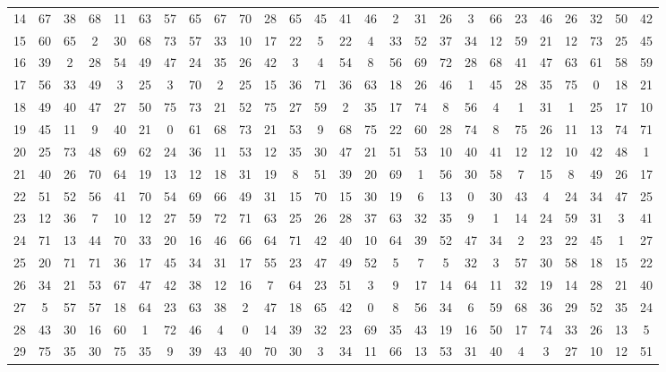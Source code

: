 \begin{table}
\begin{tabular}{c c c c c c c c c c c c c c c c c c c c c c c c c c }
14 & 67 & 38 & 68 & 11 & 63 & 57 & 65 & 67 & 70 & 28 & 65 & 45 & 41 & 46 & 2 & 31 & 26 & 3 & 66 & 23 & 46 & 26 & 32 & 50 & 42 \\
15 & 60 & 65 & 2 & 30 & 68 & 73 & 57 & 33 & 10 & 17 & 22 & 5 & 22 & 4 & 33 & 52 & 37 & 34 & 12 & 59 & 21 & 12 & 73 & 25 & 45 \\
16 & 39 & 2 & 28 & 54 & 49 & 47 & 24 & 35 & 26 & 42 & 3 & 4 & 54 & 8 & 56 & 69 & 72 & 28 & 68 & 41 & 47 & 63 & 61 & 58 & 59 \\
17 & 56 & 33 & 49 & 3 & 25 & 3 & 70 & 2 & 25 & 15 & 36 & 71 & 36 & 63 & 18 & 26 & 46 & 1 & 45 & 28 & 35 & 75 & 0 & 18 & 21 \\
18 & 49 & 40 & 47 & 27 & 50 & 75 & 73 & 21 & 52 & 75 & 27 & 59 & 2 & 35 & 17 & 74 & 8 & 56 & 4 & 1 & 31 & 1 & 25 & 17 & 10 \\
19 & 45 & 11 & 9 & 40 & 21 & 0 & 61 & 68 & 73 & 21 & 53 & 9 & 68 & 75 & 22 & 60 & 28 & 74 & 8 & 75 & 26 & 11 & 13 & 74 & 71 \\
20 & 25 & 73 & 48 & 69 & 62 & 24 & 36 & 11 & 53 & 12 & 35 & 30 & 47 & 21 & 51 & 53 & 10 & 40 & 41 & 12 & 12 & 10 & 42 & 48 & 1 \\
21 & 40 & 26 & 70 & 64 & 19 & 13 & 12 & 18 & 31 & 19 & 8 & 51 & 39 & 20 & 69 & 1 & 56 & 30 & 58 & 7 & 15 & 8 & 49 & 26 & 17 \\
22 & 51 & 52 & 56 & 41 & 70 & 54 & 69 & 66 & 49 & 31 & 15 & 70 & 15 & 30 & 19 & 6 & 13 & 0 & 30 & 43 & 4 & 24 & 34 & 47 & 25 \\
23 & 12 & 36 & 7 & 10 & 12 & 27 & 59 & 72 & 71 & 63 & 25 & 26 & 28 & 37 & 63 & 32 & 35 & 9 & 1 & 14 & 24 & 59 & 31 & 3 & 41 \\
24 & 71 & 13 & 44 & 70 & 33 & 20 & 16 & 46 & 66 & 64 & 71 & 42 & 40 & 10 & 64 & 39 & 52 & 47 & 34 & 2 & 23 & 22 & 45 & 1 & 27 \\
25 & 20 & 71 & 71 & 36 & 17 & 45 & 34 & 31 & 17 & 55 & 23 & 47 & 49 & 52 & 5 & 7 & 5 & 32 & 3 & 57 & 30 & 58 & 18 & 15 & 22 \\
26 & 34 & 21 & 53 & 67 & 47 & 42 & 38 & 12 & 16 & 7 & 64 & 23 & 51 & 3 & 9 & 17 & 14 & 64 & 11 & 32 & 19 & 14 & 28 & 21 & 40 \\
27 & 5 & 57 & 57 & 18 & 64 & 23 & 63 & 38 & 2 & 47 & 18 & 65 & 42 & 0 & 8 & 56 & 34 & 6 & 59 & 68 & 36 & 29 & 52 & 35 & 24 \\
28 & 43 & 30 & 16 & 60 & 1 & 72 & 46 & 4 & 0 & 14 & 39 & 32 & 23 & 69 & 35 & 43 & 19 & 16 & 50 & 17 & 74 & 33 & 26 & 13 & 5 \\
29 & 75 & 35 & 30 & 75 & 35 & 9 & 39 & 43 & 40 & 70 & 30 & 3 & 34 & 11 & 66 & 13 & 53 & 31 & 40 & 4 & 3 & 27 & 10 & 12 & 51 \\

\end{tabular}
\end{table}
